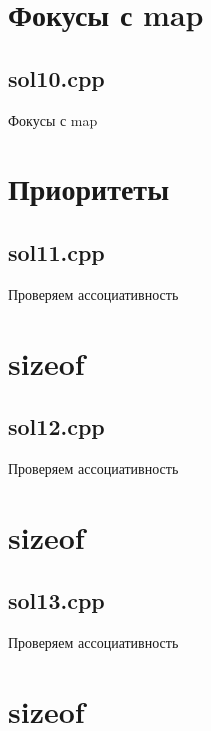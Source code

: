 \documentclass[mathserif,utf8,xcolor=table,11pt]{beamer}
\begin{document}
\section{Фокусы с map}
\subsection{sol10.cpp}
\begin{frame}[t]{Фокусы с map}
  
  
\end{frame}

\section{Приоритеты}
\subsection{sol11.cpp}
\begin{frame}[t]{Проверяем ассоциативность}
  
\end{frame}

\section{sizeof}
\subsection{sol12.cpp}
\begin{frame}[t]{Проверяем ассоциативность}
  
\end{frame}

\section{sizeof}
\subsection{sol13.cpp}
\begin{frame}[t]{Проверяем ассоциативность}
  
\end{frame}

\section{sizeof}
\end{document}
